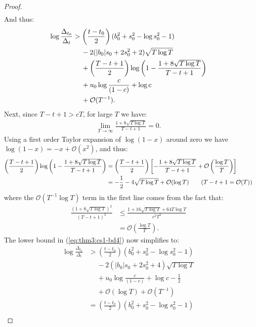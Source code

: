 \documentclass{article}
\begin{document}
\begin{proof}
\begin{align*}
\end{align*}
And thus:
\begin{align}
    \log \frac{\Delta_{t_0}}{\Delta_t} &> \left(\frac{t-t_0}{2}\right)(b_0^2 + s_0^2 - \log s_0^2 - 1) \notag \\
    &\quad\: - 2 (|b_0|s_0 +2s_0^2 + 2) \sqrt{T \log T}  \notag\\
    &\quad\: + \left(\frac{T - t+1}{2}\right)\log\left(1 - \frac{1 + 8\sqrt{T \log T}}{T-t+1}\right)  \notag\\
    &\quad\: + u_0\log \frac{c}{(1-c)} + \log c \notag \\
    &\quad\: + \mathcal{O}(T^{-1}). \label{eq:thm3:cs1-bd4}
\end{align}
Next, since $T-t + 1 > cT$, for large $T$ we have:
\begin{align*}
    \lim_{T\to \infty} \frac{1 + 8\sqrt{T \log T}}{T-t+1} = 0.
\end{align*}
Using a first order Taylor expansion of $\log(1-x)$ around zero we have $\log(1-x) = -x + \mathcal{O}(x^2)$, and thus:
\begin{align*}
    \left(\frac{T - t+1}{2}\right)\log\left(1 - \frac{1 + 8\sqrt{T \log T}}{T-t+1}\right) &= \left(\frac{T - t+1}{2}\right)\left[-\frac{1 + 8\sqrt{T \log T}}{T-t+1} + \mathcal{O} \left(\frac{\log T}{T}\right)\right] \\
    &= -\frac{1}{2} - 4 \sqrt{T\log T} + \mathcal{O}(\log T) \tag{$T-t+1 = \mathcal{O}(T)$}
\end{align*}
where the $\mathcal{O} \left(T^{-1}\log T\right)$ term in the first line comes from the fact that:
\begin{align*}
    \frac{(1 + 8\sqrt{T \log T})^2}{(T-t+1)^2} &\leq \frac{1 + 16\sqrt{T\log T} + 64 T\log T}{c^2T^2} \tag{$T-t+1 > cT$} \\
    &= \mathcal{O} \left(\frac{\log T}{T}\right).
\end{align*}
The lower bound in (\ref{eq:thm3:cs1-bd4}) now simplifies to: 
\begin{align*}
    \log \frac{\Delta_{t_0}}{\Delta_t} &> \left(\frac{t-t_0}{2}\right)(b_0^2 + s_0^2 - \log s_0^2 - 1) \\
    &\quad\: - 2 \left(|b_0|s_0 +2s_0^2 + 4\right) \sqrt{T \log T} \\
    &\quad\: + u_0\log \frac{c}{(1-c)} + \log c - \frac{1}{2} \\
    &\quad\: + \mathcal{O}(\log T) + \mathcal{O}(T^{-1}) \\
    &= \left(\frac{t-t_0}{2}\right)(b_0^2 + s_0^2 - \log s_0^2 - 1) \\

\end{align*}
\end{proof}
\end{document}
